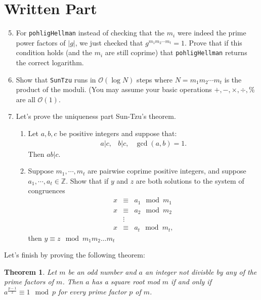 \documentclass[11pt]{article}
\newtheorem{theorem}{Theorem}
\newcommand{\bZ}{\mathbb{Z}}
\newcommand{\cO}{\mathcal{O}}
\begin{document}
  \section*{Written Part}
  \begin{enumerate}
  \setcounter{enumi}{4}
  \item{
  For \verb|pohligHellman| instead of checking that the $m_i$ were indeed the prime power factors of $|g|$, we just checked that $g^{m_1m_2\cdots m_t} = 1$.  Prove that if this condition holds (and the $m_i$ are still coprime) that \verb|pohligHellman| returns the correct logarithm.
  }
  \item{
  Show that \verb|SunTzu| runs in $\cO(\log N)$ steps where $N = m_1m_2\cdots m_t$ is the product of the moduli.  (You may assume your basic operations $+,-,\times,\div,\%$ are all $\cO(1)$.
  }
  \item{
  Let's prove the uniqueness part Sun-Tzu's theorem.
  \begin{enumerate}
    \item{
    Let $a,b,c$ be positive integers and suppose that:
    \begin{eqnarray*}
      a|c,&b|c,&\gcd(a,b) = 1.
    \end{eqnarray*}
    Then $ab|c$.
    }
    \item{
    Suppose $m_1,\cdots,m_t$ are pairwise coprime positive integers, and suppose $a_1,\cdots,a_t\in\bZ$.  Show that if $y$ and $z$ are both solutions to the system of congruences
    \begin{eqnarray*}
      x&\equiv& a_1\mod m_1\\
      x&\equiv& a_2\mod m_2\\
      &\vdots&\\
      x&\equiv& a_t\mod m_t,
    \end{eqnarray*}
     then $y\equiv z\mod m_1m_2\dots m_t$
     }
   \end{enumerate}
  }
  \end{enumerate}
  Let's finish by proving the following theorem:
  \begin{theorem}\label{SquareRoots}
  Let $m$ be an odd number and $a$ an integer not divisble by any of the prime factors of $m$.  Then $a$ has a square root mod $m$ if and only if $a^{\frac{p-1}{2}}\equiv 1\mod p$ for every prime factor $p$ of $m$.
  \end{theorem}
\end{document}
